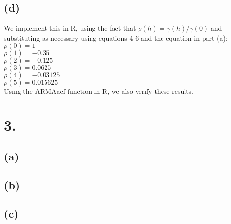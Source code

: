 \documentclass{article}
\begin{document}
{\subsection*{(d)}

We implement this in R, using the fact that $\rho(h) = \gamma(h) / \gamma(0)$ and substituting as necessary using equations 4-6 and the equation in part (a): \\
$\rho(0) = 1$ \\
$\rho(1) = -0.35$ \\
$\rho(2) = -0.125$ \\
$\rho(3) = 0.0625$ \\
$\rho(4) = -0.03125$ \\
$\rho(5) = 0.015625$ \\
Using the ARMAacf function in R, we also verify these results.

}

\section*{3.}
{\Large 

\subsection*{(a)}



\subsection*{(b)}



\subsection*{(c)}



}
\end{document}
